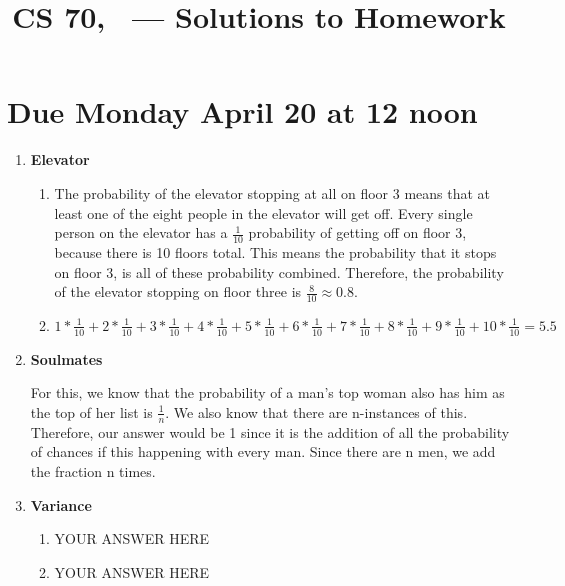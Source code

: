 \documentclass[12pt,fleqn]{article}
\title{CS 70, \Session\ --- Solutions to Homework \Homework}
\date{}
\begin{document}
\maketitle

\section*{Due Monday April 20 at 12 noon}



\begin{enumerate}
  \item \textbf{Elevator}
  
    \begin{enumerate}
      \item 
		The probability of the elevator stopping at all on floor 3 means that at least one of the eight people in the elevator will get off. Every single person on the elevator has a $\frac{1}{10}$ probability of getting off on floor 3, because there is 10 floors total. This means the probability that it stops on floor 3, is all of these probability combined. Therefore, the probability of the elevator stopping on floor three is $\frac{8}{10} \approx 0.8$. 
    
      \item 
		$1 * \frac{1}{10} + 2 * \frac{1}{10} + 3 * \frac{1}{10} + 4 * \frac{1}{10} + 5 * \frac{1}{10} + 6 * \frac{1}{10} + 7 * \frac{1}{10} + 8 * \frac{1}{10} + 9 * \frac{1}{10} + 10 * \frac{1}{10} = 5.5$
      
    \end{enumerate}
    
  
  \newpage
  \item \textbf{Soulmates}

  For this, we know that the probability of a man's top woman also has him as the top of her list is $\frac{1}{n}$. We also know that there are n-instances of this. Therefore, our answer would be 1 since it is the addition of all the probability of chances if this happening with every man. Since there are n men, we add the fraction n times. 
  
  
  \newpage
  \item \textbf{Variance}
  
    \begin{enumerate}
      \item 
      YOUR ANSWER HERE
    
      \item 
      YOUR ANSWER HERE
      

\end{enumerate}
\end{enumerate}
\end{document}
